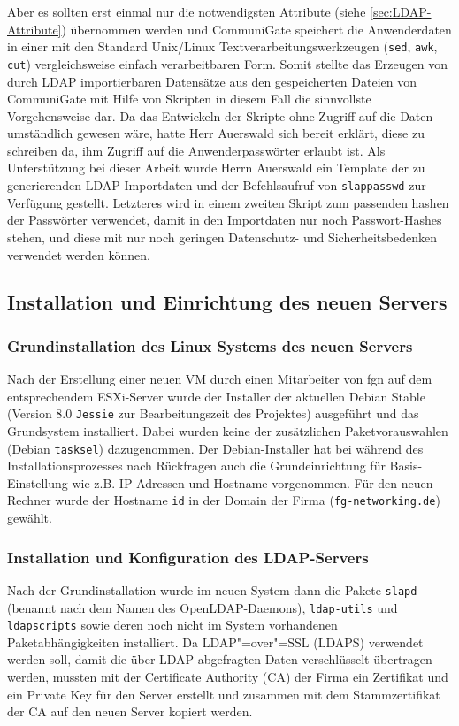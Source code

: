 \documentclass[11pt,a4paper,titlepage=firstiscover,headsepline,bibtotoc]{scrartcl} %
\begin{document}
Aber es sollten erst einmal nur die notwendigsten Attribute (siehe \autoref{sec:LDAP-Attribute}) übernommen werden und CommuniGate speichert die Anwenderdaten in einer mit den Standard Unix/Linux Textverarbeitungswerkzeugen (\texttt{sed}, \texttt{awk}, \texttt{cut}) vergleichsweise einfach verarbeitbaren Form. Somit stellte das Erzeugen von durch LDAP importierbaren Datensätze aus den gespeicherten Dateien von CommuniGate mit Hilfe von Skripten in diesem Fall die sinnvollste Vorgehensweise dar. Da das Entwickeln der Skripte ohne Zugriff auf die Daten umständlich gewesen wäre, hatte Herr Auerswald sich bereit erklärt, diese zu schreiben da, ihm Zugriff auf die Anwenderpasswörter erlaubt ist. Als Unterstützung bei dieser Arbeit wurde Herrn Auerswald ein Template der zu generierenden LDAP Importdaten und der Befehlsaufruf von \texttt{slappasswd} zur Verfügung gestellt. Letzteres wird in einem zweiten Skript zum passenden hashen der Passwörter verwendet, damit in den Importdaten nur noch Passwort-Hashes stehen, und diese mit nur noch geringen Datenschutz- und Sicherheitsbedenken verwendet werden können.

\subsection{Installation und Einrichtung des neuen Servers}
\subsubsection{Grundinstallation des Linux Systems des neuen Servers}
Nach der Erstellung einer neuen VM durch einen Mitarbeiter von fgn auf dem entsprechendem ESXi-Server wurde der Installer der aktuellen Debian Stable (Version 8.0 \texttt{Jessie} zur Bearbeitungszeit des Projektes) ausgeführt und das Grundsystem installiert. Dabei wurden keine der zusätzlichen Paketvorauswahlen (Debian \texttt{tasksel}) dazugenommen.  Der Debian-Installer hat bei während des Installationsprozesses nach Rückfragen auch die Grundeinrichtung für Basis-Einstellung wie z.B. IP-Adressen und Hostname vorgenommen. Für den neuen Rechner wurde der Hostname \texttt{id} in der Domain der Firma (\texttt{fg-networking.de}) gewählt.

\subsubsection{Installation und Konfiguration des LDAP-Servers}
Nach der Grundinstallation wurde im neuen System dann die Pakete \texttt{slapd} (benannt nach dem Namen des OpenLDAP-Daemons), \texttt{ldap-utils} und \texttt{ldapscripts} sowie deren noch nicht im System vorhandenen Paketabhängigkeiten installiert. Da LDAP"=over"=SSL (LDAPS) verwendet werden soll, damit die über LDAP abgefragten Daten verschlüsselt übertragen werden, mussten mit der Certificate Authority (CA) der Firma ein Zertifikat und ein Private Key für den Server erstellt und zusammen mit dem Stammzertifikat der CA auf den neuen Server kopiert werden.
\end{document}
